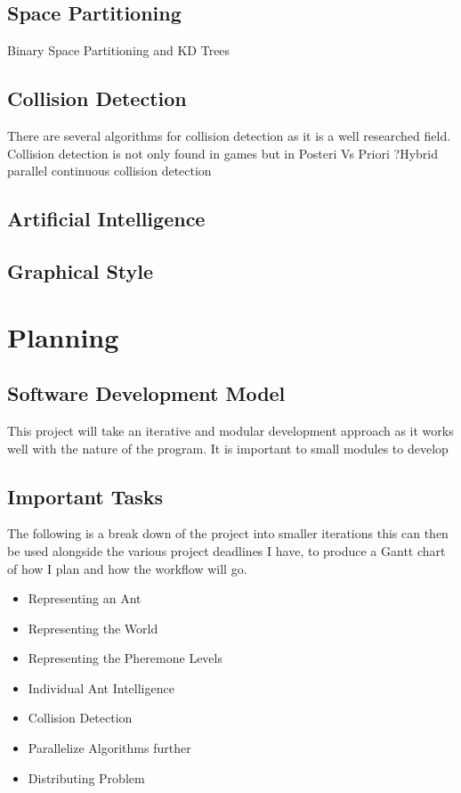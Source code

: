 \documentclass{report}
\begin{document}
\section {Space Partitioning}
Binary Space Partitioning and KD Trees
\section{Collision Detection}
There are several algorithms for collision detection as it is a well researched field. Collision detection is not only found in games but in 
Posteri Vs Priori
?Hybrid parallel continuous collision detection
\section{Artificial Intelligence} 

\section{Graphical Style}

\chapter{Planning}

\section{Software Development Model}
This project will take an iterative and modular development approach as it works well with the nature of the program. It is important to small modules to develop 

\section{Important Tasks}
The following is a break down of the project into smaller iterations this can then be used alongside the various project deadlines I have, to produce a Gantt chart of how I plan and how the workflow will go.
\begin{itemize}
	\item Representing an Ant
	\item Representing the World
	\item Representing the Pheremone Levels
	\item Individual Ant Intelligence
	\item Collision Detection
	\item Parallelize Algorithms further
	\item Distributing Problem
\end{itemize}
\end{document}
